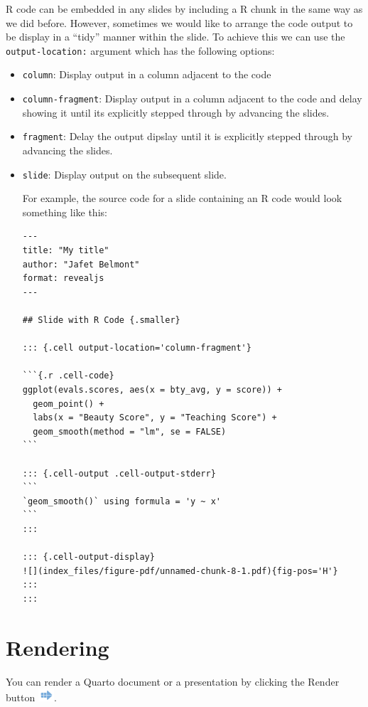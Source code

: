 \documentclass[
  letterpaper,
  DIV=11,
  numbers=noendperiod]{scrartcl}
\begin{document}
R code can be embedded in any slides by including a R chunk in the same
way as we did before. However, sometimes we would like to arrange the
code output to be display in a ``tidy'' manner within the slide. To
achieve this we can use the \texttt{output-location:} argument which has
the following options:

\begin{itemize}
\item
  \texttt{column}: Display output in a column adjacent to the code
\item
  \texttt{column-fragment}: Display output in a column adjacent to the
  code and delay showing it until its explicitly stepped through by
  advancing the slides.
\item
  \texttt{fragment}: Delay the output dipslay until it is explicitly
  stepped through by advancing the slides.
\item
  \texttt{slide}: Display output on the subsequent slide.

  For example, the source code for a slide containing an R code would
  look something like this:

\begin{verbatim}
---
title: "My title"
author: "Jafet Belmont"
format: revealjs
---

## Slide with R Code {.smaller}

::: {.cell output-location='column-fragment'}

```{.r .cell-code}
ggplot(evals.scores, aes(x = bty_avg, y = score)) +
  geom_point() +
  labs(x = "Beauty Score", y = "Teaching Score") +
  geom_smooth(method = "lm", se = FALSE)
```

::: {.cell-output .cell-output-stderr}
```
`geom_smooth()` using formula = 'y ~ x'
```
:::

::: {.cell-output-display}
![](index_files/figure-pdf/unnamed-chunk-8-1.pdf){fig-pos='H'}
:::
:::
\end{verbatim}
\end{itemize}

\hypertarget{rendering}{%
\section{Rendering}\label{rendering}}

You can render a Quarto document or a presentation by clicking the
Render button
\includegraphics[width=0.22917in,height=\textheight]{images/rstudio-render-button.png}.
\end{document}
